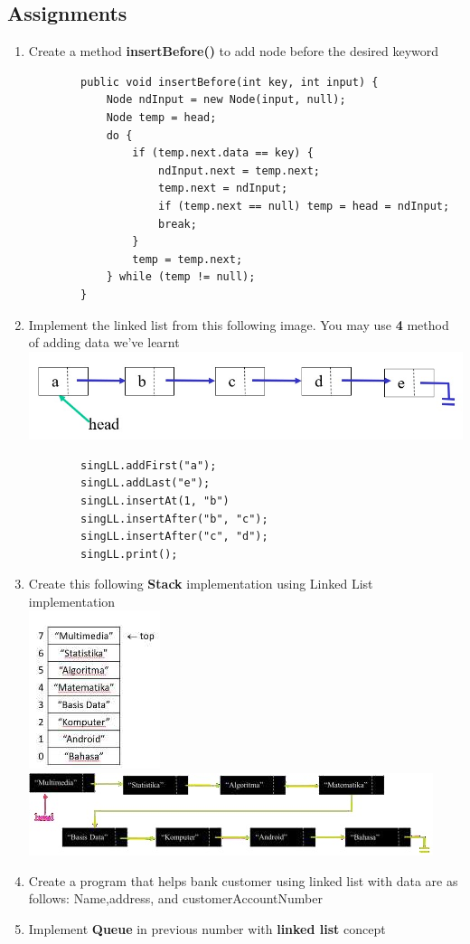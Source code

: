 \documentclass[12pt,titlepage]{article}
\begin{document}
\subsection{Assignments}
\begin{enumerate}
    \item Create a method \textbf{insertBefore()} to add node before the desired keyword
    \begin{verbatim}
        public void insertBefore(int key, int input) {
            Node ndInput = new Node(input, null);
            Node temp = head;
            do {
                if (temp.next.data == key) {
                    ndInput.next = temp.next;
                    temp.next = ndInput;
                    if (temp.next == null) temp = head = ndInput;
                    break;
                }
                temp = temp.next;
            } while (temp != null);
        }
    \end{verbatim}
    \item Implement the linked list from this following image. You may use \textbf{4} method of adding data we’ve learnt
    \hbox{}\\
    \includegraphics[width=\textwidth]{images/figures/fig1.jpeg}
    \begin{verbatim}
        singLL.addFirst("a");
        singLL.addLast("e");
        singLL.insertAt(1, "b")
        singLL.insertAfter("b", "c");
        singLL.insertAfter("c", "d");
        singLL.print();
    \end{verbatim}
    \item Create this following \textbf{Stack} implementation using Linked List implementation
    \hbox{}\\
    \includegraphics[width=.2\textwidth]{images/figures/fig2.jpeg}
    \includegraphics[width=.8\textwidth]{images/figures/fig3invert.jpg}
    \item Create a program that helps bank customer using linked list with data are as follows: Name,address, and customerAccountNumber
    \item Implement \textbf{Queue} in previous number with \textbf{linked list} concept
\end{enumerate}
\end{document}

